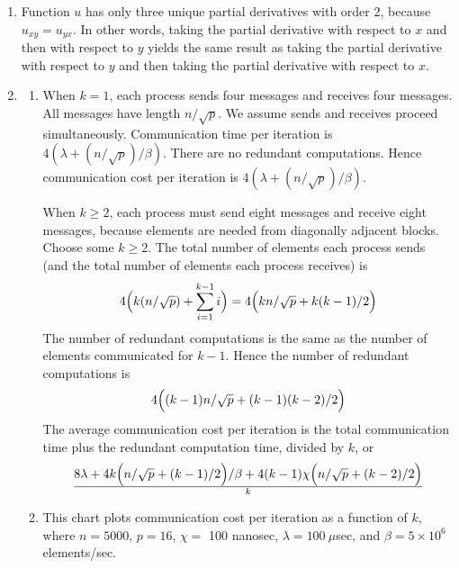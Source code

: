 \begin{enumerate}
\item Function $u$ has only three unique partial derivatives with order 2,
      because $u_{xy} = u_{yx}$. In other words, taking the partial derivative
      with respect to $x$ and then with respect to $y$ yields the same result
      as taking the partial derivative with respect to $y$ and then taking
      the partial derivative with respect to $x$.

\addtocounter{enumi}{4}

\item
\begin{enumerate}
\item
When $k = 1$, each process sends four messages and receives four messages.
All messages have length $n/\sqrt{p}$.
We assume sends and receives proceed simultaneously.
Communication time per iteration is $4(\lambda + (n/\sqrt{p})/\beta)$.
There are no redundant computations.
Hence communication cost per iteration is $4(\lambda + (n/\sqrt{p})/\beta)$.

When $k \ge 2$, each process must send eight messages and receive eight
messages, because elements are needed from diagonally adjacent blocks.
Choose some $k \ge 2$.
The total number of elements each process sends (and the total number of
elements each process receives) is
$$4\Bigl(k(n/\sqrt{p}) + \sum_{i=1}^{k-1}i\Bigr) =
4\Bigl(kn/\sqrt{p} + k(k-1)/2\Bigr)$$
The number of redundant computations 
is the same as the number of elements communicated for $k-1$.
Hence the number of redundant computations is
$$4\Bigl((k-1)n/\sqrt{p} + (k-1)(k-2)/2\Bigr)$$
The average communication cost per iteration is the total communication time
plus the redundant computation time, divided by $k$, or
$${8\lambda + 4k\Bigl(n/\sqrt{p} + (k-1)/2\Bigr)/\beta +
  4(k-1)\chi\Bigl(n/\sqrt{p} + (k-2)/2\Bigr)}\over k$$

\item This chart plots communication cost per iteration as a function of $k$,
      where $n = 5000$, $p = 16$, $\chi = $ 100 nanosec,
      $\lambda = 100\ \mu$sec, and $\beta = 5\times 10^6$ elements/sec.

      \begin{center}
      \end{center}
\end{enumerate}

\end{enumerate}

